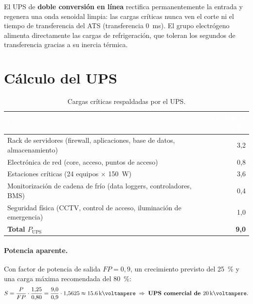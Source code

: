 \documentclass[11pt,a4paper,oneside]{report}
\begin{document}
El UPS de \textbf{doble conversión en línea} rectifica permanentemente la entrada y
regenera una onda senoidal limpia: las cargas críticas nunca ven el corte ni el tiempo de
transferencia del ATS (transferencia \SI{0}{\milli\second}). El grupo electrógeno alimenta
directamente las cargas de refrigeración, que toleran los segundos de transferencia gracias
a su inercia térmica.

\section{Cálculo del UPS}

\begin{table}[htbp]
\centering\small
\caption{Cargas críticas respaldadas por el UPS.}
\label{tab:cargas-ups}
\begin{tabularx}{\textwidth}{@{}X r@{}}
\toprule
\rowcolor{fvVerdeOsc}\textcolor{white}{\textbf{Carga}} & \textcolor{white}{\textbf{Potencia (kW)}} \\
\midrule
Rack de servidores (firewall, aplicaciones, base de datos, almacenamiento) & 3,2 \\
Electrónica de red (core, acceso, puntos de acceso)                       & 0,8 \\
Estaciones críticas (24 equipos $\times$ \SI{150}{\watt})                  & 3,6 \\
Monitorización de cadena de frío (data loggers, controladores, BMS)        & 0,4 \\
Seguridad física (CCTV, control de acceso, iluminación de emergencia)       & 1,0 \\
\midrule
\textbf{Total $P_{\text{UPS}}$} & \textbf{9,0} \\
\bottomrule
\end{tabularx}
\end{table}

\paragraph{Potencia aparente.} Con factor de potencia de salida $FP=0{,}9$, un crecimiento
previsto del \SI{25}{\percent} y una carga máxima recomendada del \SI{80}{\percent}:
\[
S = \frac{P}{FP}\cdot\frac{1{,}25}{0{,}80}
  = \frac{9{,}0}{0{,}9}\cdot 1{,}5625 \approx \SI{15,6}{\kilo\voltampere}
  \;\Rightarrow\; \textbf{UPS comercial de } \SI{20}{\kilo\voltampere}.
\]
\end{document}

